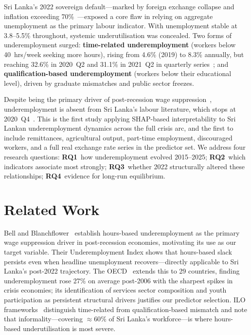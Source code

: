 \documentclass[sigconf]{acmart}
\begin{document}
Sri Lanka's 2022 sovereign default---marked by foreign exchange collapse
and inflation exceeding 70\%~\cite{cbsl2025}---exposed a core flaw in
relying on aggregate unemployment as the primary labour indicator. With
unemployment stable at 3.8--5.5\% throughout, systemic underutilisation
was concealed. Two forms of underemployment surged: \textbf{time-related
underemployment} (workers below 40~hrs/week seeking more hours), rising
from 4.6\% (2019) to 8.3\% annually, but reaching 32.6\% in 2020~Q2 and
31.1\% in 2021~Q2 in quarterly series~\cite{dcs2025}; and
\textbf{qualification-based underemployment} (workers below their
educational level), driven by graduate mismatches and public sector
freezes.

Despite being the primary driver of post-recession wage
suppression~\cite{bell2018underemployment}, underemployment is absent from
Sri Lanka's labour literature, which stops at 2020~Q4~\cite{pabasara2025impact}.
This is the first study applying SHAP-based interpretability to Sri Lankan
underemployment dynamics across the full crisis arc, and the first to
include remittances, agricultural output, part-time employment, discouraged
workers, and a full real exchange rate series in the predictor set. We
address four research questions: \textbf{RQ1}~how underemployment evolved
2015--2025; \textbf{RQ2}~which indicators associate most strongly;
\textbf{RQ3}~whether 2022 structurally altered these relationships;
\textbf{RQ4}~evidence for long-run equilibrium.

\section{Related Work}

Bell and Blanchflower~\cite{bell2018underemployment} establish hours-based
underemployment as the primary wage suppression driver in post-recession
economies, motivating its use as our target variable. Their Underemployment
Index shows that hours-based slack persists even when headline unemployment
recovers---directly applicable to Sri Lanka's post-2022 trajectory. The
OECD~\cite{oecd2017} extends this to 29 countries, finding underemployment
rose 27\% on average post-2006 with the sharpest spikes in crisis economies;
its identification of services sector composition and youth participation as
persistent structural drivers justifies our predictor selection. ILO
frameworks~\cite{ilo2013,iloweso2024} distinguish time-related from
qualification-based mismatch and note that informality---covering
${\approx}60\%$ of Sri Lanka's workforce---is where hours-based
underutilisation is most severe.
\end{document}
